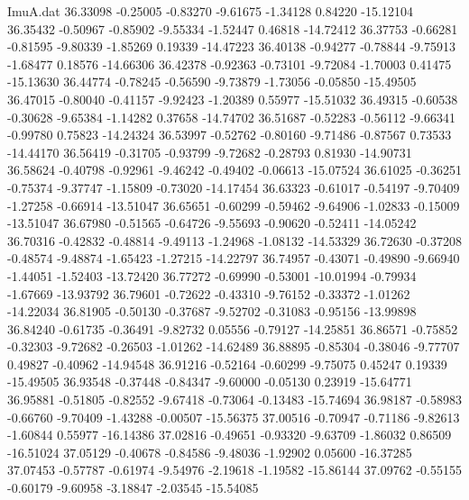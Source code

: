 \begin{filecontents}{ImuA.dat}
  36.33098   -0.25005   -0.83270   -9.61675   -1.34128    0.84220  -15.12104
  36.35432   -0.50967   -0.85902   -9.55334   -1.52447    0.46818  -14.72412
  36.37753   -0.66281   -0.81595   -9.80339   -1.85269    0.19339  -14.47223
  36.40138   -0.94277   -0.78844   -9.75913   -1.68477    0.18576  -14.66306
  36.42378   -0.92363   -0.73101   -9.72084   -1.70003    0.41475  -15.13630
  36.44774   -0.78245   -0.56590   -9.73879   -1.73056   -0.05850  -15.49505
  36.47015   -0.80040   -0.41157   -9.92423   -1.20389    0.55977  -15.51032
  36.49315   -0.60538   -0.30628   -9.65384   -1.14282    0.37658  -14.74702
  36.51687   -0.52283   -0.56112   -9.66341   -0.99780    0.75823  -14.24324
  36.53997   -0.52762   -0.80160   -9.71486   -0.87567    0.73533  -14.44170
  36.56419   -0.31705   -0.93799   -9.72682   -0.28793    0.81930  -14.90731
  36.58624   -0.40798   -0.92961   -9.46242   -0.49402   -0.06613  -15.07524
  36.61025   -0.36251   -0.75374   -9.37747   -1.15809   -0.73020  -14.17454
  36.63323   -0.61017   -0.54197   -9.70409   -1.27258   -0.66914  -13.51047
  36.65651   -0.60299   -0.59462   -9.64906   -1.02833   -0.15009  -13.51047
  36.67980   -0.51565   -0.64726   -9.55693   -0.90620   -0.52411  -14.05242
  36.70316   -0.42832   -0.48814   -9.49113   -1.24968   -1.08132  -14.53329
  36.72630   -0.37208   -0.48574   -9.48874   -1.65423   -1.27215  -14.22797
  36.74957   -0.43071   -0.49890   -9.66940   -1.44051   -1.52403  -13.72420
  36.77272   -0.69990   -0.53001  -10.01994   -0.79934   -1.67669  -13.93792
  36.79601   -0.72622   -0.43310   -9.76152   -0.33372   -1.01262  -14.22034
  36.81905   -0.50130   -0.37687   -9.52702   -0.31083   -0.95156  -13.99898
  36.84240   -0.61735   -0.36491   -9.82732    0.05556   -0.79127  -14.25851
  36.86571   -0.75852   -0.32303   -9.72682   -0.26503   -1.01262  -14.62489
  36.88895   -0.85304   -0.38046   -9.77707    0.49827   -0.40962  -14.94548
  36.91216   -0.52164   -0.60299   -9.75075    0.45247    0.19339  -15.49505
  36.93548   -0.37448   -0.84347   -9.60000   -0.05130    0.23919  -15.64771
  36.95881   -0.51805   -0.82552   -9.67418   -0.73064   -0.13483  -15.74694
  36.98187   -0.58983   -0.66760   -9.70409   -1.43288   -0.00507  -15.56375
  37.00516   -0.70947   -0.71186   -9.82613   -1.60844    0.55977  -16.14386
  37.02816   -0.49651   -0.93320   -9.63709   -1.86032    0.86509  -16.51024
  37.05129   -0.40678   -0.84586   -9.48036   -1.92902    0.05600  -16.37285
  37.07453   -0.57787   -0.61974   -9.54976   -2.19618   -1.19582  -15.86144
  37.09762   -0.55155   -0.60179   -9.60958   -3.18847   -2.03545  -15.54085

\end{filecontents}
